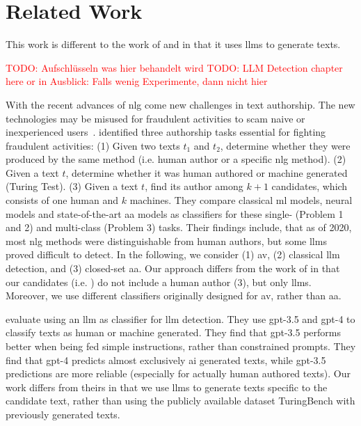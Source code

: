 \chapter{Related Work}
\label{chap:related_work}

This work is different to the work of \citet{koppel_determining_2014} and \citet{kocher_unine_2015} 
in that it uses \acp{llm} to generate \imp{} texts.

\textcolor{red}{TODO: Aufschlüsseln was hier behandelt wird}
\textcolor{red}{TODO: LLM Detection chapter here or in Ausblick: Falls wenig Experimente, dann nicht hier}


With the recent advances of \ac{nlg} come new challenges in text authorship.
The new technologies may be misused for fraudulent activities to scam naive or inexperienced users~\citep{uchendu_authorship_2020,bhattacharjee_fighting_2024}.
\citet{uchendu_authorship_2020} identified three authorship tasks essential for fighting fraudulent activities:
(1) Given two texts $t_1$ and $t_2$, determine whether they were produced by the same method (i.e. human author or a specific \ac{nlg} method).
(2) Given a text $t$, determine whether it was human authored or machine generated (Turing Test).
(3) Given a text $t$, find its author among $k+1$ candidates, which consists of one human and $k$ machines.
They compare classical \ac{ml} models, neural models and state-of-the-art \ac{aa} models as classifiers 
for these single- (Problem 1 and 2) and multi-class (Problem 3) tasks.
Their findings include, that as of 2020, most \ac{nlg} methods were distinguishable from human authors, 
but some \acp{llm} proved difficult to detect.
In the following, we consider (1) \ac{av}, (2) classical \ac{llm} detection, and (3) closed-set \ac{aa}.
Our approach differs from the work of \citet{uchendu_authorship_2020} in that our candidates (i.e. \imps{}) do not include a human author (3), 
but only \acp{llm}.
Moreover, we use different classifiers originally designed for \ac{av}, rather than \ac{aa}.

\citet{bhattacharjee_fighting_2024} evaluate using an \ac{llm} as classifier for \ac{llm} detection.
They use \ac{gpt}-3.5 and \ac{gpt}-4 to classify texts as human or machine generated.
They find that \ac{gpt}-3.5 performs better when being fed simple instructions, rather than constrained prompts.
They find that \ac{gpt}-4 predicts almost exclusively \ac{ai} generated texts, 
while \ac{gpt}-3.5 predictions are more reliable (especially for actually human authored texts).
Our work differs from theirs in that we use \acp{llm} to generate \imp{} texts specific to the candidate text, 
rather than using the publicly available dataset TuringBench with previously generated texts.

